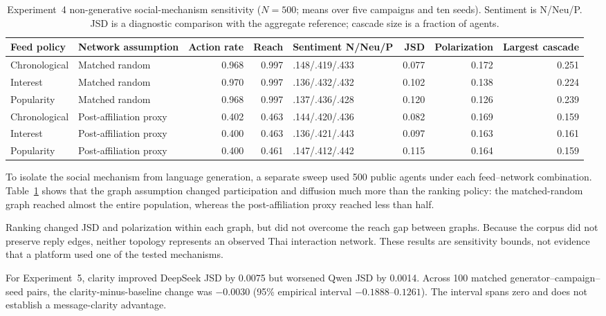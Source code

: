 \documentclass[conference]{IEEEtran}
\begin{document}
\begin{table}[!t]
\caption{Experiment~4 non-generative social-mechanism sensitivity ($N=500$;
means over five campaigns and ten seeds). Sentiment is N/Neu/P. JSD is a
diagnostic comparison with the aggregate reference; cascade size is a fraction
of agents.}
\label{tab:mechanism}
\centering
\footnotesize
\begin{tabular}{@{}llrrlrrr@{}}
\toprule
Feed policy & Network assumption & Action rate & Reach & Sentiment N/Neu/P & JSD & Polarization & Largest cascade \\
\midrule
Chronological & Matched random & 0.968 & 0.997 & .148/.419/.433 & 0.077 & 0.172 & 0.251 \\
Interest      & Matched random & 0.970 & 0.997 & .136/.432/.432 & 0.102 & 0.138 & 0.224 \\
Popularity    & Matched random & 0.968 & 0.997 & .137/.436/.428 & 0.120 & 0.126 & 0.239 \\
Chronological & Post-affiliation proxy & 0.402 & 0.463 & .144/.420/.436 & 0.082 & 0.169 & 0.159 \\
Interest      & Post-affiliation proxy & 0.400 & 0.463 & .136/.421/.443 & 0.097 & 0.163 & 0.161 \\
Popularity    & Post-affiliation proxy & 0.400 & 0.461 & .147/.412/.442 & 0.115 & 0.164 & 0.159 \\
\bottomrule
\end{tabular}
\end{table}

To isolate the social mechanism from language generation, a separate sweep
used 500 public agents under each feed--network combination.
Table~\ref{tab:mechanism} shows that the graph assumption changed participation
and diffusion much more than the ranking policy: the matched-random graph
reached almost the entire population, whereas the post-affiliation proxy
reached less than half.

Ranking changed JSD and polarization within each graph, but did not overcome
the reach gap between graphs. Because the corpus did not preserve reply edges,
neither topology represents an observed Thai interaction network. These
results are sensitivity bounds, not evidence that a platform used one of the
tested mechanisms.

For Experiment~5, clarity improved DeepSeek JSD by 0.0075 but worsened Qwen JSD
by 0.0014. Across 100 matched generator--campaign--seed pairs, the
clarity-minus-baseline change was $-0.0030$ (95\% empirical interval
$-0.1888$--$0.1261$). The interval spans zero and does not establish a
message-clarity advantage.
\end{document}

